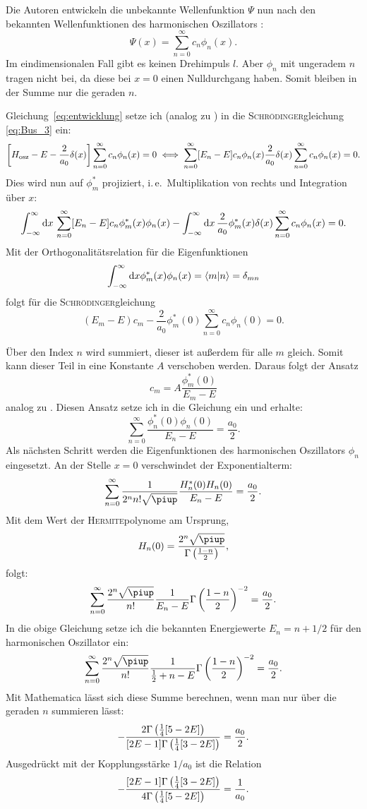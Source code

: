 Die Autoren entwickeln die unbekannte Wellenfunktion $\Psi$ nun nach den
bekannten Wellenfunktionen des harmonischen Oszillators :
\begin{equation}
    \label{eq:entwicklung}
    \Psi(x) = \sum_{n=0}^\infty c_n \phi_n(x).
\end{equation}
Im eindimensionalen Fall gibt es keinen Drehimpuls $l$. Aber $\phi_n$ mit
ungeradem $n$ tragen nicht bei, da diese bei $x = 0$ einen Nulldurchgang haben.
Somit bleiben in der Summe nur die geraden $n$.

Gleichung~\eqref{eq:entwicklung} setze ich (analog zu ) in die
\textsc{Schrödinger}gleichung \eqref{eq:Bus_3} ein:
\[
    \sbr{H_\text{osz} - E - \frac2{a_0} \delta(x)}
    \sum_{n=0}^\infty c_n \phi_n(x)
    = 0
    \iff
    \sum_{n=0}^\infty [E_n - E] c_n \phi_n(x)
    \frac2{a_0} \delta(x)
    \sum_{n=0}^\infty c_n \phi_n(x)
    = 0.
\]
Dies wird nun auf $\phi_m^*$ projiziert, i.\,e.\ Multiplikation von rechts und
Integration über $x$:
\[
    \int_{-\infty}^\infty \dif x \, \sum_{n=0}^\infty
    [E_n - E] c_n \phi_m^*(x) \phi_n(x)
    -
    \int_{-\infty}^\infty \dif x \,  \frac2{a_0} \phi_m^*(x) \delta(x)
    \sum_{n=0}^\infty c_n \phi_n(x) = 0.
\]
Mit der Orthogonalitätsrelation für die Eigenfunktionen
\[
    \int_{-\infty}^\infty \dif x \phi_m^*(x) \phi_n(x) = \braket{m|n} =
    \delta_{mn}
\]
folgt für die \textsc{Schrödinger}gleichung
\[
    (E_m - E) c_m - \frac2{a_0} \phi_m^*(0) \sum_{n=0}^\infty c_n \phi_n(0) =
    0.
\]

Über den Index $n$ wird summiert, dieser ist außerdem für alle $m$ gleich.
Somit kann dieser Teil in eine Konstante $A$ verschoben werden. Daraus folgt
der Ansatz
\[
    c_m = A \frac{\phi_m^*(0)}{E_m - E}
\]
analog zu . Diesen Ansatz setze ich in die Gleichung ein und erhalte:
\[
    \sum_{n=0}^\infty \frac{\phi_n^*(0) \phi_n(0)}{E_n - E} = \frac{a_0}2.
\]
Als nächsten Schritt werden die Eigenfunktionen des harmonischen Oszillators
$\phi_n$ eingesetzt. An der Stelle $x = 0$ verschwindet der Exponentialterm:
\[
    \sum_{n=0}^\infty \frac{1}{2^n n! \sqrt\piup} \frac{H_n^*(0) H_n(0)}{E_n -
    E} = \frac{a_0}2.
\]
Mit dem Wert der \textsc{Hermite}polynome am Ursprung,
\[
    H_n(0) = \frac{2^n \sqrt\piup}{\Gamma\del{\frac{1-n}2}},
\]
folgt:
\[
    \sum_{n=0}^\infty \frac{2^n \sqrt\piup}{n!} \frac{1}{E_n -
    E} \Gamma\del{\frac{1-n}2}^{-2} = \frac{a_0}2.
\]
In die obige Gleichung setze ich die bekannten Energiewerte $E_n = n + 1/2$ für
den harmonischen Oszillator ein:
\[
    \sum_{n=0}^\infty \frac{2^n \sqrt\piup}{n!} \frac{1}{\frac 12 + n -
    E} \Gamma\del{\frac{1-n}2}^{-2} = \frac{a_0}2.
\]
Mit Mathematica lässt sich diese Summe berechnen, wenn man nur über die geraden
$n$ summieren lässt:
\[
    - \frac{2 \Gamma\del{\frac 14[5-2E]}}{[2E-1]\Gamma\del{\frac 14[3-2E]}}
    = \frac{a_0}2.
\]
Ausgedrückt mit der Kopplungsstärke $1/a_0$ ist die Relation
\begin{equation}
    \label{eq:Energie-Delta}
    - \frac{[2E-1]\Gamma\del{\frac 14[3-2E]}}{4 \Gamma\del{\frac 14[5-2E]}}
    = \frac1{a_0}.
\end{equation}

